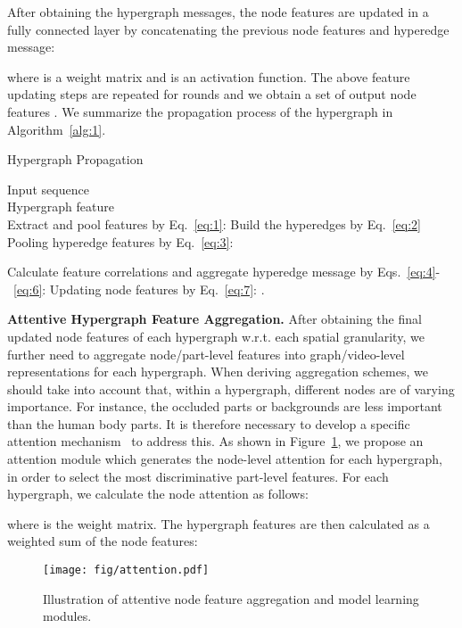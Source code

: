 \documentclass[10pt,twocolumn,letterpaper]{article}
\begin{document}
After obtaining the hypergraph messages, the node features are updated in a fully connected layer by concatenating the previous node features and hyperedge message:

where  is a weight matrix and  is an activation function.
The above feature updating steps are repeated for  rounds and we obtain a set of output node features . We summarize the propagation process of the hypergraph in Algorithm~\ref{alg:1}.

\setlength{\textfloatsep}{10pt}
\begin{algorithm}[t]
\caption{Hypergraph Propagation}
\label{alg:1}
\begin{algorithmic}[1]
\REQUIRE Input sequence \\
\ENSURE Hypergraph feature  \\
\STATE Extract and pool features by Eq.~\ref{eq:1}:  
\STATE Build the hyperedges by Eq.~\ref{eq:2}
\FOR{}
\STATE Pooling hyperedge features by Eq.~\ref{eq:3}:
 
\STATE Calculate feature correlations and aggregate hyperedge message by Eqs.~\ref{eq:4}-~\ref{eq:6}: 
\STATE Updating node features by Eq.~\ref{eq:7}: 
\ENDFOR
\STATE .
\end{algorithmic}
\end{algorithm}


\textbf{Attentive Hypergraph Feature Aggregation.}
After obtaining the final updated node features of each hypergraph w.r.t. each spatial granularity, we further need to aggregate node/part-level features into graph/video-level representations for each hypergraph. When deriving aggregation schemes, we should take into account that, within a hypergraph, different nodes are of varying importance. For instance, the occluded parts or backgrounds are less important than the human body parts. It is therefore necessary to develop a specific attention mechanism~\cite{DBLP:journals/corr/BahdanauCB14,Lu_2019_CVPR} to address this.
As shown in Figure~\ref{fig:att}, we propose an attention module which generates the node-level attention for each hypergraph, in order to select the most discriminative part-level features. For each hypergraph, we calculate the node attention  as follows:


where  is the weight matrix. The hypergraph features are then calculated as a weighted sum of the node features:



\begin{figure}[t]
\setlength{\abovecaptionskip}{-0.1mm}
    \centering
    \texttt{[image: fig/attention.pdf]}
    \caption{Illustration of attentive node feature aggregation and model learning modules.}
    \label{fig:att}
\end{figure}
\end{document}
